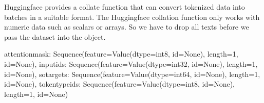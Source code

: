 \documentclass[letterpaper,10pt,english]{jupyterBook}
\begin{document}
\sphinxAtStartPar
Huggingface provides a collate function that can convert tokenized data into batches in a suitable format.
The Huggingface collation function only works with numeric data such as scalars or arrays. So we have to drop all texts before we pass the dataset into the  object.
\begin{sphinxVerbatimInput}

\begin{sphinxVerbatim}[commandchars=\\\{\}]
  
    \PYG{p}{[}  \PYG{p}{]}  \PYG{p}{[}     \PYG{p}{]}
\PYG{p}{[}\PYG{p}{]}
\end{sphinxVerbatim}
\end{sphinxVerbatimInput}
\begin{sphinxVerbatimOutput}

\begin{sphinxVerbatim}[commandchars=\\\{\}]
\PYGZob{}\PYGZsq{}attention\PYGZus{}mask\PYGZsq{}: Sequence(feature=Value(dtype=\PYGZsq{}int8\PYGZsq{}, id=None), length=\PYGZhy{}1, id=None),
 \PYGZsq{}input\PYGZus{}ids\PYGZsq{}: Sequence(feature=Value(dtype=\PYGZsq{}int32\PYGZsq{}, id=None), length=\PYGZhy{}1, id=None),
 \PYGZsq{}so\PYGZus{}targets\PYGZsq{}: Sequence(feature=Value(dtype=\PYGZsq{}int64\PYGZsq{}, id=None), length=\PYGZhy{}1, id=None),
 \PYGZsq{}token\PYGZus{}type\PYGZus{}ids\PYGZsq{}: Sequence(feature=Value(dtype=\PYGZsq{}int8\PYGZsq{}, id=None), length=\PYGZhy{}1, id=None)\PYGZcb{}
\end{sphinxVerbatim}
\end{sphinxVerbatimOutput}
\end{document}
